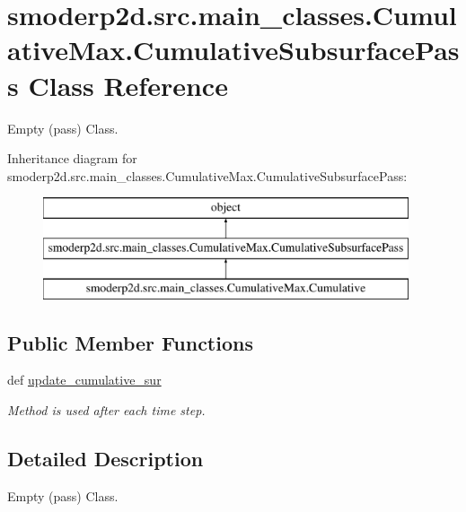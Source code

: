 \hypertarget{classsmoderp2d_1_1src_1_1main__classes_1_1CumulativeMax_1_1CumulativeSubsurfacePass}{\section{smoderp2d.\-src.\-main\-\_\-classes.\-Cumulative\-Max.\-Cumulative\-Subsurface\-Pass Class Reference}
\label{classsmoderp2d_1_1src_1_1main__classes_1_1CumulativeMax_1_1CumulativeSubsurfacePass}
}


Empty (pass) Class.  


Inheritance diagram for smoderp2d.\-src.\-main\-\_\-classes.\-Cumulative\-Max.\-Cumulative\-Subsurface\-Pass\-:\begin{figure}[H]
\begin{center}
\leavevmode
\includegraphics[height=3.000000cm]{classsmoderp2d_1_1src_1_1main__classes_1_1CumulativeMax_1_1CumulativeSubsurfacePass}
\end{center}
\end{figure}
\subsection*{Public Member Functions}
\begin{DoxyCompactItemize}
\item 
def \hyperlink{classsmoderp2d_1_1src_1_1main__classes_1_1CumulativeMax_1_1CumulativeSubsurfacePass_a4cd34bafce5287c9f1ca7ebcf1f941a6}{update\-\_\-cumulative\-\_\-sur}
\begin{DoxyCompactList}\small\item\em Method is used after each time step. \end{DoxyCompactList}\end{DoxyCompactItemize}


\subsection{Detailed Description}
Empty (pass) Class. 

